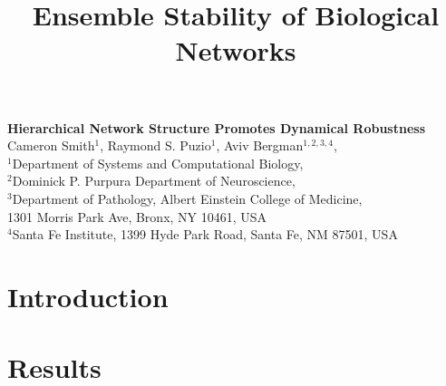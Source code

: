 



\let\ref\autoref


\title{Ensemble Stability of Biological Networks}

\begin{center}
{\Large
\textbf{Hierarchical Network Structure Promotes Dynamical Robustness}
}
\\[.5cm]
Cameron Smith$^{1}$,
Raymond S. Puzio$^{1}$,
Aviv Bergman$^{1,2,3,4}$,
\\[.5cm]
$^1$Department of Systems and Computational Biology,\\
$^2$Dominick P. Purpura Department of Neuroscience,\\
$^3$Department of Pathology, Albert Einstein College of Medicine,\\
1301 Morris Park Ave, Bronx, NY 10461, USA\\
$^4$Santa Fe Institute, 1399 Hyde Park Road, Santa Fe, NM 87501, USA
\\[.5cm]
\end{center}


% 
{\bf

}



\section{Introduction}


\section{Results}


